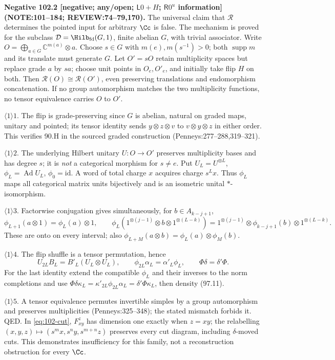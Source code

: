 \textbf{Negative 102.2 [negative; any/open; \(\mathsf L0+H\); \(\mathsf R0^u\) information]\newline (NOTE:101--184; REVIEW:74--79,170).}
The universal claim that \(\mathcal R\) determines the pointed input for arbitrary \(\Cc\) is false. The mechanism is
proved for the subclass \(\mathcal D=\Hilb_{\mathrm{fd}}(G,1)\), finite abelian \(G\), with trivial associator.
Write \(O=\bigoplus_{a\in G}\mathbb C^{m(a)}\otimes a\). Choose \(s\in G\) with \(m(e),m(s^{-1})>0\);
both \(\operatorname{supp}m\) and its translate must generate \(G\). Let \(O'=sO\) retain multiplicity spaces
but replace grade \(a\) by \(sa\); choose unit points in \(O_e,O'_e\), and initially take flip \(H\) on both.
Then \(\mathcal R(O)\cong\mathcal R(O')\), even preserving translations and endomorphism concatenation.
If no group automorphism matches the two multiplicity functions, no tensor equivalence carries \(O\) to \(O'\).
\par\(\langle1\rangle1\). The flip is grade-preserving since \(G\) is abelian, natural on graded maps,
unitary and pointed; its tensor identity sends \(y\otimes z\otimes v\) to \(v\otimes y\otimes z\)
in either order. This verifies 90.H in the sourced graded construction (Penneys:277--288,319--321).
\par\(\langle1\rangle2\). The underlying Hilbert unitary \(U:O\to O'\) preserves multiplicity bases and
has degree \(s\); it is \emph{not} a categorical morphism for \(s\ne e\). Put \(U_L=U^{\otimes L}\),
\(\phi_L=\operatorname{Ad}U_L\), \(\phi_0=\mathrm{id}\). A word of total charge \(x\) acquires charge \(s^Lx\).
Thus \(\phi_L\) maps all categorical matrix units bijectively and is an isometric unital \(*\)-isomorphism.
\par\(\langle1\rangle3\). Factorwise conjugation gives simultaneously, for \(b\in A_{k-j+1}\),
\[
 \phi_{L+1}(a\otimes1)=\phi_L(a)\otimes1,\qquad
 \phi_L(1^{\otimes(j-1)}\otimes b\otimes1^{\otimes(L-k)})
 =1^{\otimes(j-1)}\otimes\phi_{k-j+1}(b)\otimes1^{\otimes(L-k)}.
\]
These are onto on every interval; also \(\phi_{L+M}(a\otimes b)=\phi_L(a)\otimes\phi_M(b)\).
\par\(\langle1\rangle4\). The flip shuffle is a tensor permutation, hence
\begin{equation}\label{eq:102-intertwiner}
 U_{2L}B_L=B'_L(U_L\otimes U_L),\qquad
 \phi_{2L}\alpha_L=\alpha'_L\phi_L,\qquad \Phi\delta=\delta'\Phi.
\end{equation}
For the last identity extend the compatible \(\phi_L\) and their inverses to the norm completions and use
\(\Phi\delta\kappa_L=\kappa'_{2L}\phi_{2L}\alpha_L=\delta'\Phi\kappa_L\), then density (97.11).
\par\(\langle1\rangle5\). A tensor equivalence permutes invertible simples by a group automorphism
and preserves multiplicities (Penneys:325--348); the stated mismatch forbids it. QED.
In \eqref{eq:102-cut}, \(F_{xy}^z\) has dimension one exactly when \(z=xy\); the relabelling
\((x,y,z)\mapsto(s^mx,s^ny,s^{m+n}z)\) preserves every cut diagram, including \(\delta\)-moved cuts.
This demonstrates insufficiency for this family, not a reconstruction obstruction for every \(\Cc\).

